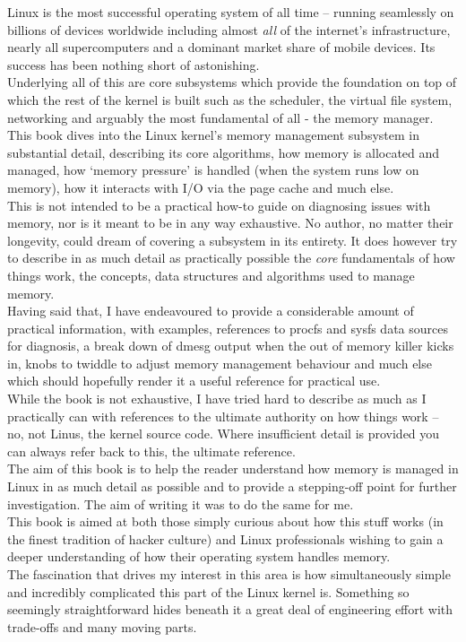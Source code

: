 Linux is the most successful operating system of all time -- running seamlessly
on billions of devices worldwide including almost \emph{all} of the
internet's infrastructure, nearly all supercomputers and a dominant market share
of mobile devices. Its success has been nothing short of astonishing.\\

Underlying all of this are core subsystems which provide the foundation on top
of which the rest of the kernel is built such as the scheduler, the virtual file
system, networking and arguably the most fundamental of all - the memory
manager.\\

This book dives into the Linux kernel's memory management subsystem in
substantial detail, describing its core algorithms, how memory is allocated and
managed, how `memory pressure' is handled (when the system runs low on memory),
how it interacts with I/O via the page cache and much else.\\

This is not intended to be a practical how-to guide on diagnosing issues with
memory, nor is it meant to be in any way exhaustive. No author, no matter their
longevity, could dream of covering a subsystem in its entirety. It does however
try to describe in as much detail as practically possible the \emph{core}
fundamentals of how things work, the concepts, data structures and algorithms
used to manage memory.\\

Having said that, I have endeavoured to provide a considerable amount of
practical information, with examples, references to procfs and sysfs data
sources for diagnosis, a break down of dmesg output when the out of memory
killer kicks in, knobs to twiddle to adjust memory management behaviour and much
else which should hopefully render it a useful reference for practical use.\\

While the book is not exhaustive, I have tried hard to describe as much as I
practically can with references to the ultimate authority on how things work --
no, not Linus, the kernel source code. Where insufficient detail is provided you
can always refer back to this, the ultimate reference.\\

The aim of this book is to help the reader understand how memory is managed in
Linux in as much detail as possible and to provide a stepping-off point for
further investigation. The aim of writing it was to do the same for me.\\

This book is aimed at both those simply curious about how this stuff works (in
the finest tradition of hacker culture) and Linux professionals wishing to gain
a deeper understanding of how their operating system handles memory.\\

The fascination that drives my interest in this area is how simultaneously
simple and incredibly complicated this part of the Linux kernel is. Something so
seemingly straightforward hides beneath it a great deal of engineering effort
with trade-offs and many moving parts.\\
